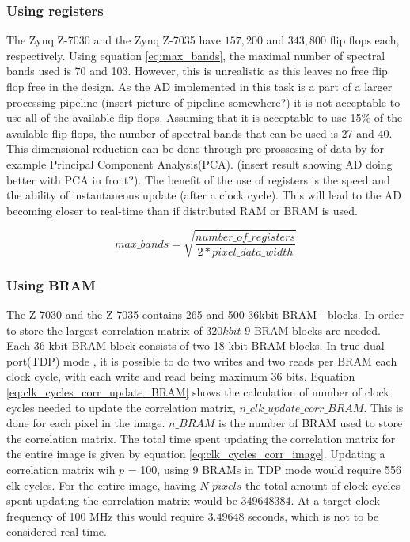 \subsubsection{Using registers}
The Zynq Z-7030 and the Zynq Z-7035 have $157,200$ and $343,800$ flip flops each, respectively. Using equation \ref{eq:max_bands}, the maximal number of spectral bands used is 70 and 103. However, this is unrealistic as this leaves no free flip flop free in the design. As the AD implemented in this task is a part of a larger processing pipeline (insert picture of pipeline somewhere?) it is not acceptable to use all of the available flip flops. Assuming that it is acceptable to use 15\% of the available flip flops, the number of spectral bands that can be used is 27 and 40. This dimensional reduction can be done through pre-prossesing of data by for example Principal Component Analysis(PCA). (insert result showing AD doing better with PCA in front?). 
The benefit of the use of registers is the speed and the ability of instantaneous update (after a clock cycle). This will lead to the AD becoming closer to real-time than if distributed RAM or BRAM is used.

\begin{equation}
    max\_bands= \sqrt{\frac{number\_of\_registers}{2*pixel\_data\_width}}
    \label{eq:max_bands}
\end{equation}

\subsubsection{Using BRAM}
The Z-7030 and the Z-7035 contains 265 and 500 $36$kbit BRAM - blocks. In  order to store the largest correlation matrix of $320 kbit$ 9 BRAM blocks are needed. Each 36 kbit BRAM block consists of two 18 kbit BRAM blocks. In true dual port(TDP) mode \cite{cite:ug953}, it is possible to do two writes and two reads per BRAM each clock cycle, with each write and read being maximum 36 bits. Equation \ref{eq:clk_cycles_corr_update_BRAM} shows the calculation of number of clock cycles needed to update the correlation matrix, $n\_clk\_update\_corr\_BRAM$. This is done for each pixel in the image. $n\_BRAM$ is the number of BRAM used to store the correlation matrix. The total time spent updating the correlation matrix for the entire image is given by equation \ref{eq:clk_cycles_corr_image}. Updating a correlation matrix wih $p$ = 100, using 9 BRAMs in TDP mode would require 556 clk cycles. For the entire image, having $N\_pixels$ the total amount of clock cycles spent updating the correlation matrix would be 349648384. At a target clock frequency of 100 MHz this would require $3.49648$ seconds, which is not to be considered real time.   

